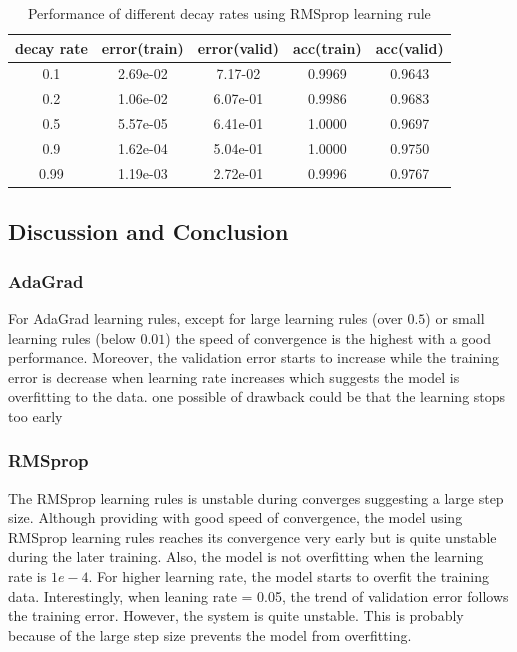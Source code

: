 \documentclass[11pt]{article}
\begin{document}
\begin{table}
\begin{center}
\begin{tabular}{ c c c c c} 
\hline
decay rate & error(train) & error(valid) & acc(train) & acc(valid)\\
\hline
\hline
0.1 & 2.69e-02 & 7.17-02 & 0.9969 & 0.9643 \\ 
0.2 & 1.06e-02 & 6.07e-01 & 0.9986 & 0.9683 \\ 
0.5 & 5.57e-05 & 6.41e-01 & 1.0000 & 0.9697 \\ 
0.9  &  1.62e-04 & 5.04e-01 & 1.0000 & 0.9750 \\
0.99  &  1.19e-03 & 2.72e-01 & 0.9996 & 0.9767 \\
\end{tabular}
\caption{Performance of different decay rates using RMSprop learning rule}
\label{tb:rms_decay}
\end{center}	
\end{table}

\subsection{Discussion and Conclusion}
\subsubsection{AdaGrad}
For AdaGrad learning rules, except for large learning rules (over $0.5$) or small learning rules (below $0.01$) the speed of convergence is the highest with a good performance. Moreover, the validation error starts to increase while the training error is decrease when learning rate increases which suggests the model is overfitting to the data. one possible of drawback could be that the learning stops too early 
\subsubsection{RMSprop}
The RMSprop learning rules is unstable during converges suggesting a large step size. Although providing with good speed of convergence, the model using RMSprop learning rules reaches its convergence very early but is quite unstable during the later training. Also, the model is not overfitting when the learning rate is $1e-4$. For higher learning rate, the model starts to overfit the training data. Interestingly, when leaning rate = 0.05, the trend of validation error follows the training error. However, the system is quite unstable. This is probably because of the large step size prevents the model from overfitting.
\end{document}
